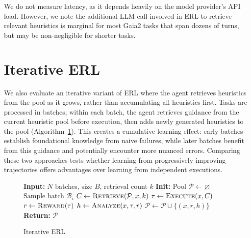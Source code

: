 \documentclass{article}
\begin{document}
We do not measure latency, as it depends heavily on the model provider's API load. However, we note the additional LLM call involved in ERL to retrieve relevant heuristics is marginal for most Gaia2 tasks that span dozens of turns, but may be non-negligible for shorter tasks.

\section{Iterative ERL}

We also evaluate an iterative variant of ERL where the agent retrieves heuristics from the pool as it grows, rather than accumulating all heuristics first. Tasks are processed in batches; within each batch, the agent retrieves guidance from the current heuristic pool before execution, then adds newly generated heuristics to the pool (Algorithm~\ref{alg:iterative-reflective-learning-llm}). This creates a cumulative learning effect: early batches establish foundational knowledge from naive failures, while later batches benefit from this guidance and potentially encounter more nuanced errors. Comparing these two approaches tests whether learning from progressively improving trajectories offers advantages over learning from independent executions.

\begin{figure}[h]
  \centering
  \begin{minipage}{0.5\textwidth}
    \begin{algorithm}[H]
      \caption{Iterative ERL}
      \label{alg:iterative-reflective-learning-llm}
      \begin{algorithmic}[1]
        \STATE \textbf{Input:} $N$ batches, size $B$, retrieval count $k$
        \STATE \textbf{Init:} Pool $\mathcal{P} \leftarrow \varnothing$
        \STATE Sample batch $\mathcal{B}_i$
        \STATE $C \leftarrow \textsc{Retrieve}(\mathcal{P}, x, k)$
        \STATE $\tau \leftarrow \textsc{Execute}(x, C)$
        \STATE $r \leftarrow \textsc{Reward}(\tau)$
        \STATE $h \leftarrow \textsc{Analyze}(x, \tau, r)$
        \STATE $\mathcal{P} \leftarrow \mathcal{P} \cup \{(x, r, h)\}$
        \ENDFOR
        \ENDFOR
        \STATE \textbf{Return:} $\mathcal{P}$
      \end{algorithmic}
    \end{algorithm}
  \end{minipage}
\end{figure}
\end{document}
